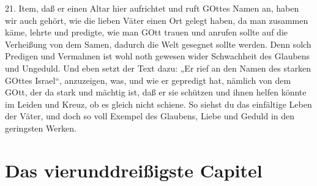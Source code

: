 21. Item, daß er einen Altar hier aufrichtet und ruft GOttes Namen an, haben wir auch gehört, wie die lieben Väter einen Ort gelegt haben, da man zusammen käme, lehrte und predigte, wie man GOtt trauen und anrufen sollte auf die Verheißung von dem Samen, dadurch die Welt gesegnet sollte werden. Denn solch Predigen und Vermahnen ist wohl noth gewesen wider Schwachheit des Glaubens und Ungeduld. Und eben setzt der Text dazu: „Er rief an den Namen des starken GOttes Israel“, anzuzeigen, was, und wie er gepredigt hat, nämlich von dem GOtt, der da stark und mächtig ist, daß er sie schützen und ihnen helfen könnte im Leiden und Kreuz, ob es gleich nicht schiene. So siehst du das einfältige Leben der Väter, und doch so voll Exempel des Glaubens, Liebe und Geduld in den geringsten Werken.

\section{Das vierunddreißigste Capitel}
